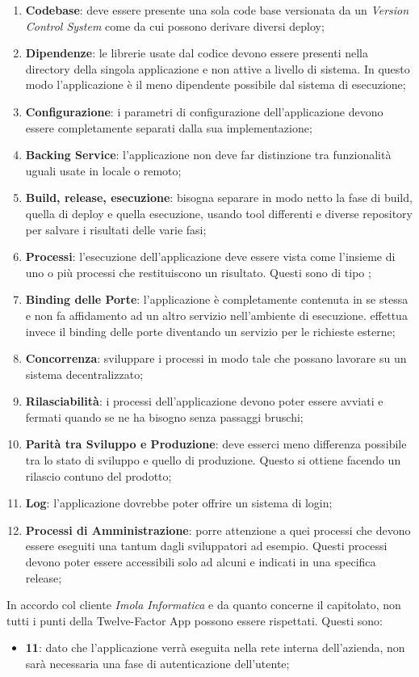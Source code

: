 \begin{enumerate}
	\item \textbf{Codebase}: deve essere presente una sola code base versionata da un \textit{Version Control System} come  da cui possono derivare diversi deploy;
	\item \textbf{Dipendenze}: le librerie usate dal codice devono essere presenti nella directory della singola applicazione e non attive a livello di sistema. In questo modo l'applicazione è il meno dipendente possibile dal sistema di esecuzione;
	\item \textbf{Configurazione}: i parametri di configurazione dell'applicazione devono essere completamente separati dalla sua implementazione;
	\item \textbf{Backing Service}: l'applicazione non deve far distinzione tra funzionalità uguali usate in locale o remoto;
	\item \textbf{Build, release, esecuzione}: bisogna separare in modo netto la fase di build, quella di deploy e quella esecuzione, usando tool differenti e diverse repository per salvare i risultati delle varie fasi;
	\item \textbf{Processi}: l'esecuzione dell'applicazione deve essere vista come l'insieme di uno o più processi che restituiscono un risultato. Questi sono di tipo ;
	\item \textbf{Binding delle Porte}: l'applicazione è completamente contenuta in se stessa e non fa affidamento ad un altro servizio nell'ambiente di esecuzione. effettua invece il binding delle porte diventando un servizio per le richieste esterne;
	\item \textbf{Concorrenza}: sviluppare i processi in modo tale che possano lavorare su un sistema decentralizzato;
	\item \textbf{Rilasciabilità}: i processi dell'applicazione devono poter essere avviati e fermati quando se ne ha bisogno senza passaggi bruschi;
	\item \textbf{Parità tra Sviluppo e Produzione}: deve esserci meno differenza possibile tra lo stato di sviluppo e quello di produzione. Questo si ottiene facendo un rilascio contuno del prodotto;
	\item \textbf{Log}: l'applicazione dovrebbe poter offrire un sistema di login;
	\item \textbf{Processi di Amministrazione}: porre attenzione a quei processi che devono essere eseguiti una tantum dagli sviluppatori ad esempio. Questi processi devono poter essere accessibili solo ad alcuni e indicati in una specifica release;
\end{enumerate}

In accordo col cliente \textit{Imola Informatica} e da quanto concerne il capitolato, non tutti i punti della Twelve-Factor App possono essere rispettati. Questi sono:

\begin{itemize}
	\item \textbf{11}: dato che l'applicazione verrà eseguita nella rete interna dell'azienda, non sarà necessaria una fase di autenticazione dell'utente;
\end{itemize}